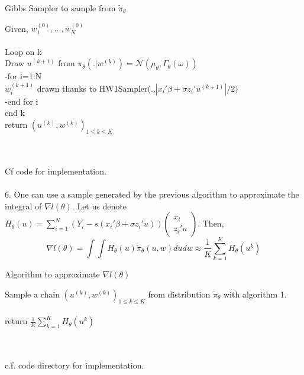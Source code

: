 \begin{algorithm}
	\caption{Gibbs Sampler to sample from $\tilde{\pi}_{\theta}$}\label{RS}
	Given, $w_{1}^{(0)}, ..., w_{N}^{(0)}$~\\
	~\\
	Loop on k~\\
	Draw $u^{(k+1)}$ from $\pi_{\theta}(. | w^{(k)}) = \mathcal{N}(\mu_{\theta},\Gamma_{\theta}(\omega))$~\\
	-for i=1:N~\\
	$w_{i}^{(k+1)}$ drawn thanks to HW1Sampler(.,$|x_i'\beta + \sigma z_i' u^{(k+1)}|/2)$\\
	-end for i~\\
	end k~\\
	return $(u^{(k)},w^{(k)})_{1\leq k \leq K}$
\end{algorithm}~\\
~\\
Cf code for implementation.~\\
~\\
6. One can use a sample generated by the previous algorithm to approximate the integral of $\nabla l(\theta)$.
Let us denote $H_{\theta}(u)=\sum_{i=1}^{N}(Y_i-s(x_i'\beta+\sigma z_i'u)) \left(
\begin{smallmatrix}
x_i\\ z_i'u
\end{smallmatrix}
\right)$. Then, 
$$\nabla l(\theta) = \int \int H_{\theta}(u)\tilde{\pi}_{\theta}(u,w)dudw   \approx \frac{1}{K}\sum_{k=1}^{K} H_{\theta}(u^k) $$
\begin{algorithm}
	\caption{Algorithm to approximate $ \nabla l(\theta)$}\label{RS}
	Sample a chain $(u^{(k)},w^{(k)})_{1\leq k \leq K}$ from distribution $\tilde{\pi}_{\theta}$ with algorithm 1.~\\
	~\\
	return $\frac{1}{K}\sum_{k=1}^{K} H_{\theta}(u^k)$
\end{algorithm}~\\
~\\

 c.f. code directory for implementation.
